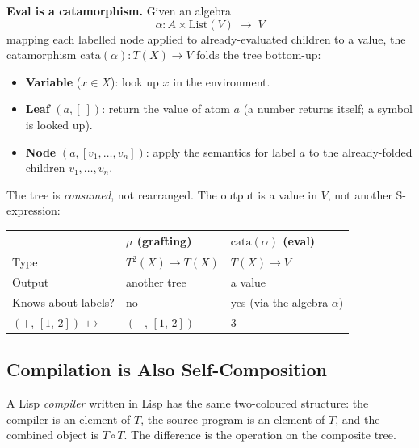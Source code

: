 \documentclass[11pt,a4paper]{article}
\theoremstyle{definition}
\theoremstyle{plain}
\begin{document}
\medskip
\noindent\textbf{Eval is a catamorphism.}\quad
Given an algebra
\[
\alpha : A \times \mathrm{List}(V) \;\longrightarrow\; V
\]
mapping each labelled node applied to already-evaluated children to a
value, the catamorphism $\mathrm{cata}(\alpha) : T(X) \to V$ folds the
tree bottom-up:
\begin{itemize}[nosep]
\item \textbf{Variable} ($x \in X$): look up $x$ in the environment.
\item \textbf{Leaf} $(a, [\ ])$: return the value of atom $a$
  (a number returns itself; a symbol is looked up).
\item \textbf{Node} $(a, [v_1, \ldots, v_n])$: apply the semantics
  for label $a$ to the already-folded children $v_1, \ldots, v_n$.
\end{itemize}
The tree is \emph{consumed}, not rearranged. The output is a value in
$V$, not another S-expression:
\begin{center}
\renewcommand{\arraystretch}{1.3}
\begin{tabular}{@{}lll@{}}
\hline
& $\mu$ (grafting) & $\mathrm{cata}(\alpha)$ (eval) \\
\hline
Type & $T^2(X) \to T(X)$ & $T(X) \to V$ \\
Output & another tree & a value \\
Knows about labels? & no & yes (via the algebra $\alpha$) \\
$(\mathord{+},\, [1,\, 2]) \;\mapsto$ & $(\mathord{+},\, [1,\, 2])$
  & $3$ \\
\hline
\end{tabular}
\end{center}

\subsection{Compilation is Also Self-Composition}

A Lisp \emph{compiler} written in Lisp has the same two-coloured
structure: the compiler is an element of $T$, the source program is
an element of $T$, and the combined object is $T \circ T$. The
difference is the operation on the composite tree.
\end{document}
